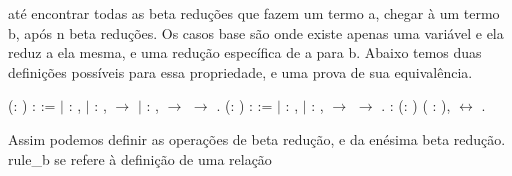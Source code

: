 até encontrar todas as beta reduções que fazem um termo a, chegar à um termo b, após n beta reduções. Os casos base são onde existe apenas uma
variável e ela reduz a ela mesma, e uma redução específica de a para b. Abaixo temos duas definições possíveis para essa propriedade, e uma prova
de sua equivalência. \begin{coqdoccode}
\coqdocemptyline
\coqdocnoindent
{}  (:  ) :   :=\coqdoceol
\coqdocnoindent
\ensuremath{|} : \coqdockw{\ensuremath{\forall}} ,    \coqdoceol
\coqdocnoindent
\ensuremath{|} : \coqdockw{\ensuremath{\forall}}  ,    \ensuremath{\rightarrow}    \coqdoceol
\coqdocnoindent
\ensuremath{|} : \coqdockw{\ensuremath{\forall}}   ,     \ensuremath{\rightarrow}     \ensuremath{\rightarrow}    .\coqdoceol
\coqdocemptyline
\coqdocnoindent
{}  (:  ) :   :=\coqdoceol
\coqdocnoindent
\ensuremath{|} : \coqdockw{\ensuremath{\forall}} ,    \coqdoceol
\coqdocnoindent
\ensuremath{|} : \coqdockw{\ensuremath{\forall}}   ,    \ensuremath{\rightarrow}     \ensuremath{\rightarrow}    .\coqdoceol
\coqdocemptyline
\coqdocnoindent
{} : \coqdockw{\ensuremath{\forall}} (:  ) ( : ),     \ensuremath{\leftrightarrow}    .\coqdoceol
\coqdocemptyline
\end{coqdoccode}
Assim podemos definir as operações de beta redução, e da enésima beta redução. rule\_b se refere à definição de uma relação
